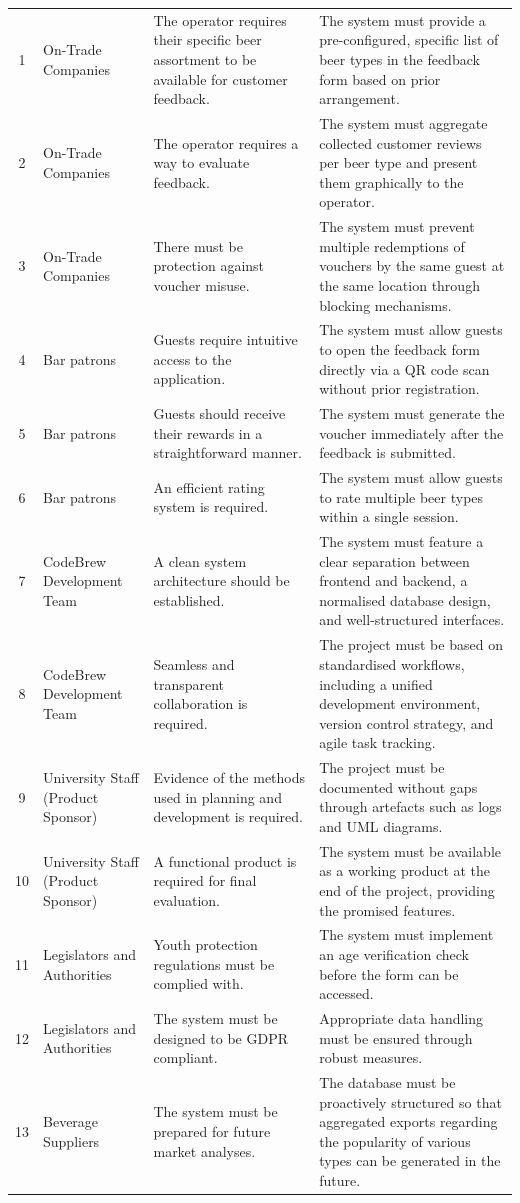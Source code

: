 \documentclass[a4paper,12pt]{article}
\begin{document}
\begin{xltabular}{\textwidth}{@{} c p{2.5cm} p{4cm} X @{}}
	1 & On-Trade Companies & The operator requires their specific beer assortment to be available for customer feedback. &
	The system must provide a pre-configured, specific list of beer types in the feedback form based on prior arrangement. \\
	2 & On-Trade Companies & The operator requires a way to evaluate feedback. &
	The system must aggregate collected customer reviews per beer type and present them graphically to the operator. \\
	3 & On-Trade Companies & There must be protection against voucher misuse. &
	The system must prevent multiple redemptions of vouchers by the same guest at the same location through blocking mechanisms. \\
	4 & Bar patrons & Guests require intuitive access to the application. &
	The system must allow guests to open the feedback form directly via a QR code scan without prior registration. \\
	5 & Bar patrons & Guests should receive their rewards in a straightforward manner. &
	The system must generate the voucher immediately after the feedback is submitted. \\
	6 & Bar patrons & An efficient rating system is required. & The system must allow guests to rate multiple beer types within a single session. \\
	7 & CodeBrew Development Team & A clean system architecture should be established. &
	The system must feature a clear separation between frontend and backend, a normalised database design, and well-structured interfaces. \\
	8 & CodeBrew Development Team & Seamless and transparent collaboration is required. &
	The project must be based on standardised workflows, including a unified development environment, version control strategy, and agile task tracking. \\
	9 & University Staff (Product Sponsor) & Evidence of the methods used in planning and development is required. &
	The project must be documented without gaps through artefacts such as logs and UML diagrams. \\
	10 & University Staff (Product Sponsor) & A functional product is required for final evaluation. &
	The system must be available as a working product at the end of the project, providing the promised features. \\
	11 & Legislators and Authorities & Youth protection regulations must be complied with. &
	The system must implement an age verification check before the form can be accessed. \\
	12 & Legislators and Authorities & The system must be designed to be GDPR compliant. &
	Appropriate data handling must be ensured through robust measures. \\
	13 & Beverage Suppliers & The system must be prepared for future market analyses. &
	The database must be proactively structured so that aggregated exports regarding the popularity of various types can be generated in the future. \\
\end{xltabular}
\end{document}
